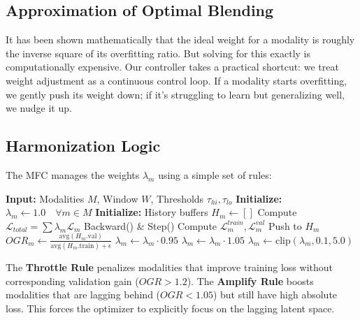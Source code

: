\documentclass[10pt, twocolumn, letterpaper]{article}
\begin{document}
\subsection{Approximation of Optimal Blending}
It has been shown mathematically \cite{gradient_blending} that the ideal weight for a modality is roughly the inverse square of its overfitting ratio. But solving for this exactly is computationally expensive. Our controller takes a practical shortcut: we treat weight adjustment as a continuous control loop. If a modality starts overfitting, we gently push its weight down; if it's struggling to learn but generalizing well, we nudge it up.

\subsection{Harmonization Logic}
The MFC manages the weights $\lambda_m$ using a simple set of rules:

\begin{algorithm}[h]
\caption{Modality Fairness Controller (MFC)}
\begin{algorithmic}[1]
\STATE \textbf{Input:} Modalities $M$, Window $W$, Thresholds $\tau_{hi}, \tau_{lo}$
\STATE \textbf{Initialize:} $\lambda_m \leftarrow 1.0 \quad \forall m \in M$
\STATE \textbf{Initialize:} History buffers $H_m \leftarrow []$
        \STATE Compute $\mathcal{L}_{total} = \sum \lambda_m \mathcal{L}_m$
        \STATE Backward() \& Step()
    \ENDFOR
        \STATE Compute $\mathcal{L}^{train}_m, \mathcal{L}^{val}_m$
        \STATE Push to $H_m$
            \STATE $OGR_m \leftarrow \frac{\text{avg}(H_m.\text{val})}{\text{avg}(H_m.\text{train}) + \epsilon}$
                \STATE $\lambda_m \leftarrow \lambda_m \cdot 0.95$ 
                \STATE $\lambda_m \leftarrow \lambda_m \cdot 1.05$ 
            \ENDIF
            \STATE $\lambda_m \leftarrow \text{clip}(\lambda_m, 0.1, 5.0)$
        \ENDIF
    \ENDFOR
\ENDFOR
\end{algorithmic}
\label{alg:mfc}
\end{algorithm}

The \textbf{Throttle Rule} penalizes modalities that improve training loss without corresponding validation gain ($OGR > 1.2$). The \textbf{Amplify Rule} boosts modalities that are lagging behind ($OGR < 1.05$) but still have high absolute loss. This forces the optimizer to explicitly focus on the lagging latent space.
\end{document}
